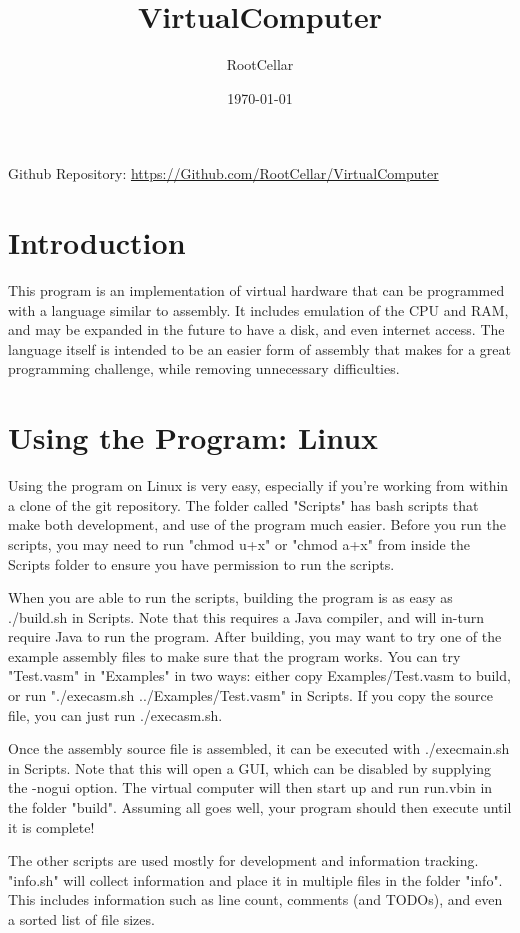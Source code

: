 \documentclass[12pt]{article}
\title{\bfseries VirtualComputer}
\author{RootCellar}
\date{\today}
\begin{document}
\maketitle

Github Repository: \url{https://Github.com/RootCellar/VirtualComputer}

\section{Introduction}

This program is an implementation of virtual hardware that can be programmed with a language similar to assembly.
It includes emulation of the CPU and RAM, and may be expanded in the future to have a disk, and even internet access.
The language itself is intended to be an easier form of assembly that makes for a great programming challenge, while
removing unnecessary difficulties.

\section{Using the Program: Linux}

Using the program on Linux is very easy, especially if you're working from within a clone of the git repository.
The folder called "Scripts" has bash scripts that make both development, and use of the program much easier.
Before you run the scripts, you may need to run "chmod u+x" or "chmod a+x" from inside the Scripts folder to
ensure you have permission to run the scripts.

When you are able to run the scripts, building the program is as easy as ./build.sh in Scripts. Note that this requires a Java compiler,
and will in-turn require Java to run the program. After building, you may want to try one of the example assembly
files to make sure that the program works. You can try "Test.vasm" in "Examples" in two ways: either copy Examples/Test.vasm to build, or
run "./execasm.sh ../Examples/Test.vasm" in Scripts. If you copy the source file, you can just run ./execasm.sh.

Once the assembly source file is assembled, it can be executed with ./execmain.sh in Scripts. Note that this will open a GUI,
which can be disabled by supplying the -nogui option. The virtual computer will then start up and run run.vbin in the folder "build".
Assuming all goes well, your program should then execute until it is complete!

The other scripts are used mostly for development and information tracking. "info.sh" will collect information and place it
in multiple files in the folder "info". This includes information such as line count, comments (and TODOs), and even a sorted list of file sizes.
\end{document}
